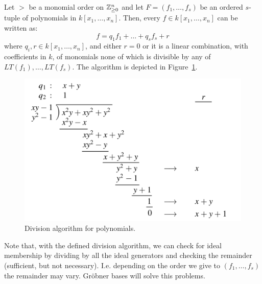 \begin{theorem}
    Let $>$ be a monomial order on $\mathbb{Z}^n_{\geq 0}$ and let $F = (f_1, \dots, f_s)$ be an ordered $s$-tuple of polynomials in $k[x_1, \dots, x_n]$.
    Then, every $f \in k[x_1, \dots, x_n]$ can be written as:
    $$f = q_1f_1 + \dots + q_sf_s + r$$
    where $q_i, r \in k[x_1, \dots, x_n]$, and either $r = 0$ or it is a linear combination, with coefficients in $k$, of monomials none of which is divisible by any of $LT(f_1), \dots, LT(f_s)$.
    The algorithm is depicted in Figure~\ref{fig:division-algorithm}.
\end{theorem}
\begin{figure}[h!]
    \centering
    \includegraphics[width=.6\textwidth]{img/division.png}
    \caption{Division algorithm for polynomials.\label{fig:division-algorithm}}
\end{figure}

Note that, with the defined division algorithm, we can check for ideal membership by dividing by all the ideal generators and checking the remainder (sufficient, but not necessary). I.e. depending on the order we give to $(f_1, \dots, f_s)$ the remainder may vary.
Gr\"obner bases will solve this problems.
